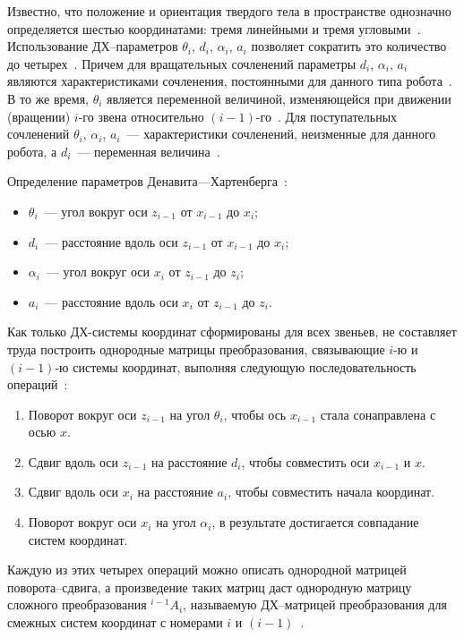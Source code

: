 \documentclass[oneside, final, 14pt]{extarticle}
\begin{document}
Известно, что положение и ориентация твердого тела в пространстве однозначно определяется шестью координатами: тремя линейными и тремя угловыми~\cite{borisov:mod_rob}. \label{p:dh-param}
Использование ДХ--параметров \(\theta_i\), \(d_i\), \(\alpha_i\), \(a_i\) позволяет сократить это количество до четырех~\cite{borisov:mod_rob}.
Причем для вращательных сочленений параметры \(d_i\), \(\alpha_i\), \(a_i\) являются характеристиками сочленения, постоянными для данного типа робота~\cite{fu:rob_tech}.
В то же время, \(\theta_i\) является переменной величиной, изменяющейся при движении (вращении) \(i\)-го звена относительно \((i - 1)\)-го~\cite{fu:rob_tech}.
Для поступательных сочленений  \(\theta_i\), \(\alpha_i\), \(a_i\)~--- характеристики сочленений, неизменные для данного робота, а \(d_i\)~--- переменная величина~\cite{fu:rob_tech}.
\par
Определение параметров Денавита---Хартенберга~\cite{borisov:mod_rob}:
\begin{itemize}
  \item \(\theta_i\)~--- угол вокруг оси \(z_{i - 1}\) от \(x_{i - 1}\) до \(x_i\);
  \item \(d_i\)~--- расстояние вдоль оси \(z_{i - 1}\) от \(x_{i - 1}\) до \(x_i\);
  \item \(\alpha_i\)~--- угол вокруг оси \(x_i\) от \(z_{i - 1}\) до \(z_i\);
  \item \(a_i\)~--- расстояние вдоль оси \(x_i\) от \(z_{i - 1}\) до \(z_i\).
\end{itemize}
\par
Как только ДХ-системы координат сформированы для всех звеньев, не составляет труда построить однородные матрицы преобразования, связывающие \(i\)-ю и \((i-1)\)-ю системы координат, выполняя следующую последовательность операций~\cite{fu:rob_tech}:
\begin{enumerate}
  \item Поворот вокруг оси \(z_{i-1}\) на угол \(\theta_i\), чтобы ось \(x_{i-1}\) стала сонаправлена с осью \(x\).
  \item Сдвиг вдоль оси \(z_{i-1}\) на расстояние \(d_i\), чтобы совместить оси \(x_{i-1}\) и \(x\).
  \item Сдвиг вдоль оси \(x_i\) на расстояние \(a_i\), чтобы совместить начала координат.
  \item Поворот вокруг оси \(x_i\) на угол \(\alpha_i\), в результате достигается совпадание систем координат.
\end{enumerate}
\par
Каждую из этих четырех операций можно описать однородной матрицей поворота--сдвига, а произведение таких матриц даст однородную матрицу сложного преобразования \({}^{i-1}A_i\), называемую ДХ--матрицей преобразования для смежных систем координат с номерами \(i\) и \((i-1)\)~\cite{fu:rob_tech}.
\end{document}
